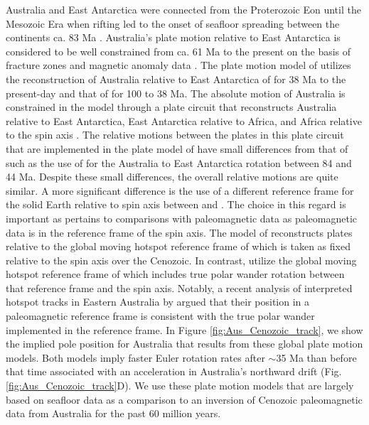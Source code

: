 \documentclass[11pt,letterpaper]{article}
\begin{document}
Australia and East Antarctica were connected from the Proterozoic Eon until the Mesozoic Era when rifting led to the onset of seafloor spreading between the continents ca. 83 Ma \citep{Williams2011a, Veevers2012a}. Australia's plate motion relative to East Antarctica is considered to be well constrained from ca. 61 Ma to the present on the basis of fracture zones and magnetic anomaly data \citep{Cande2004a}. The plate motion model of \cite{Muller2016a} utilizes the reconstruction of Australia relative to East Antarctica of \cite{Cande2004a} for 38 Ma to the present-day and that of \cite{Whittaker2007a} for 100 to 38 Ma. The absolute motion of Australia is constrained in the model through a plate circuit that reconstructs Australia relative to East Antarctica, East Antarctica relative to Africa, and Africa relative to the spin axis \citep{Muller2016a}. The relative motions between the plates in this plate circuit that are implemented in the plate model of \cite{Torsvik2017a} have small differences from that of \cite{Muller2016a} such as the use of \cite{Tikku2000a} for the Australia to East Antarctica rotation between 84 and 44 Ma. Despite these small differences, the overall relative motions are quite similar. A more significant difference is the use of a different reference frame for the solid Earth relative to spin axis between \cite{Muller2016a} and \cite{Torsvik2017a}. The choice in this regard is important as pertains to comparisons with paleomagnetic data as paleomagnetic data is in the reference frame of the spin axis. The model of \cite{Muller2016a} reconstructs plates relative to the global moving hotspot reference frame of \cite{Torsvik2008a} which is taken as fixed relative to the spin axis over the Cenozoic. In contrast, \cite{Torsvik2017a} utilize the global moving hotspot reference frame of \cite{Doubrovine2012a} which includes true polar wander rotation between that reference frame and the spin axis. Notably, a recent analysis of interpreted hotspot tracks in Eastern Australia by \cite{Hansma2020a} argued that their position in a paleomagnetic reference frame is consistent with the true polar wander implemented in the \cite{Doubrovine2012a} reference frame. In Figure \ref{fig:Aus_Cenozoic_track}, we show the implied pole position for Australia that results from these global plate motion models. Both models imply faster Euler rotation rates after $\sim$35 Ma than before that time associated with an acceleration in Australia's northward drift (Fig. \ref{fig:Aus_Cenozoic_track}D). We use these plate motion models that are largely based on seafloor data as a comparison to an inversion of Cenozoic paleomagnetic data from Australia for the past 60 million years.
\end{document}
